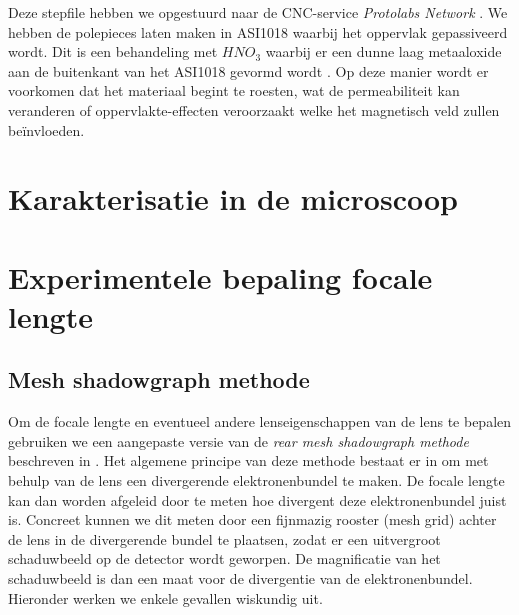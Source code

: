 \documentclass[we,twoside,openright,a4paper,11pt]{uantwerpenbamathesis}
\begin{document}
Deze stepfile hebben we opgestuurd naar de CNC-service \textit{Protolabs Network} \cite{Hubs}. We hebben de polepieces laten maken in ASI1018 waarbij het oppervlak gepassiveerd wordt. Dit is een behandeling met $HNO_3$ waarbij er een dunne laag metaaloxide aan de buitenkant van het ASI1018 gevormd wordt \cite{MALLER199828}. Op deze manier wordt er voorkomen dat het materiaal begint te roesten, wat de permeabiliteit kan veranderen of oppervlakte-effecten veroorzaakt welke het magnetisch veld zullen beïnvloeden.

\section{Karakterisatie in de microscoop}\label{ch:karakterisatie}

\section{Experimentele bepaling focale lengte}

\subsection{Mesh shadowgraph methode}
Om de focale lengte en eventueel andere lenseigenschappen van de lens te bepalen gebruiken we een aangepaste versie van de \textit{rear mesh shadowgraph methode} beschreven in \cite{meshshadowgraphs}. Het algemene principe van deze methode bestaat er in om met behulp van de lens een divergerende elektronenbundel te maken. De focale lengte kan dan worden afgeleid door te meten hoe divergent deze elektronenbundel juist is. Concreet kunnen we dit meten door een fijnmazig rooster (mesh grid) achter de lens in de divergerende bundel te plaatsen, zodat er een uitvergroot schaduwbeeld op de detector wordt geworpen. De magnificatie van het schaduwbeeld is dan een maat voor de divergentie van de elektronenbundel. Hieronder werken we enkele gevallen wiskundig uit.\\
\end{document}
